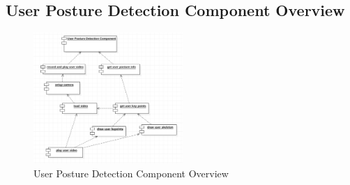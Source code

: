 \documentclass[16pt]{scrreprt}
\begin{document}
\subsection{User Posture Detection Component Overview}
\begin{figure}[H]
  \centering
  \includegraphics[width=0.505\textwidth]{diagrams/detection-com.png}
  \caption{User Posture Detection Component Overview}
\end{figure}
\end{document}
